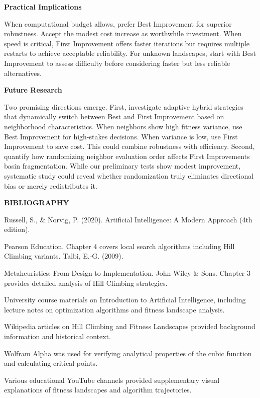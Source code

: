 \documentclass[
]{article}
\begin{document}
\textbf{Practical Implications}

When
computational budget allows, prefer Best Improvement for superior
robustness. Accept the modest cost increase as worthwhile investment.
When speed is critical, First Improvement offers faster iterations but
requires multiple restarts to achieve acceptable reliability. For
unknown landscapes, start with Best Improvement to assess difficulty
before considering faster but less reliable alternatives.

\textbf{Future Research}

Two promising directions emerge. First, investigate adaptive
hybrid strategies that dynamically switch between Best and First
Improvement based on neighborhood characteristics. When neighbors show
high fitness variance, use Best Improvement for high-stakes decisions.
When variance is low, use First Improvement to save cost. This could
combine robustness with efficiency. Second, quantify how randomizing
neighbor evaluation order affects First Improvement\textquotesingle s
basin fragmentation. While our preliminary tests show modest
improvement, systematic study could reveal whether randomization truly
eliminates directional bias or merely redistributes it.

\begin{center}
\textbf{BIBLIOGRAPHY}
\end{center}

Russell, S., \& Norvig, P. (2020). Artificial Intelligence: A Modern
Approach (4th edition).

Pearson Education. Chapter 4 covers local search algorithms including
Hill Climbing variants. Talbi, E.-G. (2009).

Metaheuristics: From Design to Implementation. John Wiley \& Sons.
Chapter 3 provides detailed analysis of Hill Climbing strategies.

University course materials on Introduction to Artificial Intelligence,
including lecture notes on optimization algorithms and fitness landscape
analysis.

Wikipedia articles on Hill Climbing and Fitness Landscapes provided
background information and historical context.

Wolfram Alpha was used for verifying analytical properties of the cubic
function and calculating critical points.

Various educational YouTube channels provided supplementary visual
explanations of fitness landscapes and algorithm trajectories.
\end{document}
